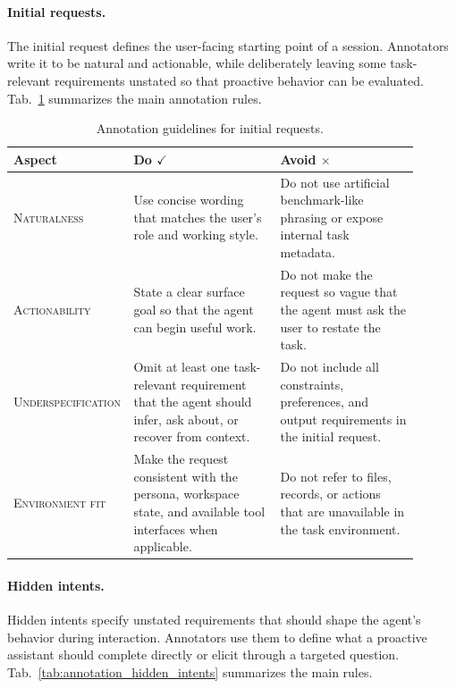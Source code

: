 \documentclass{llmxive}
\begin{document}
\paragraph{Initial requests.}
The initial request defines the user-facing starting point of a session. Annotators write it to be natural and actionable, while deliberately leaving some task-relevant requirements unstated so that proactive behavior can be evaluated. Tab.~\ref{tab:annotation_initial_request} summarizes the main annotation rules.

\begin{table}[tb]
\centering
\small
\begin{tabular}{p{0.20\linewidth}p{0.36\linewidth}p{0.34\linewidth}}
\toprule[1.25pt]
\textbf{Aspect} & \textbf{Do} $\checkmark$ & \textbf{Avoid} $\times$ \\
\midrule[0.75pt]
\textsc{Naturalness} &
Use concise wording that matches the user's role and working style. &
Do not use artificial benchmark-like phrasing or expose internal task metadata. \\
\midrule[0.75pt]
\textsc{Actionability} &
State a clear surface goal so that the agent can begin useful work. &
Do not make the request so vague that the agent must ask the user to restate the task. \\
\midrule[0.75pt]
\textsc{Underspecification} &
Omit at least one task-relevant requirement that the agent should infer, ask about, or recover from context. &
Do not include all constraints, preferences, and output requirements in the initial request. \\
\midrule[0.75pt]
\textsc{Environment fit} &
Make the request consistent with the persona, workspace state, and available tool interfaces when applicable. &
Do not refer to files, records, or actions that are unavailable in the task environment. \\
\bottomrule[1.25pt]
\end{tabular}
\caption{Annotation guidelines for initial requests.}
\label{tab:annotation_initial_request}
\end{table}

\paragraph{Hidden intents.}
Hidden intents specify unstated requirements that should shape the agent's behavior during interaction. Annotators use them to define what a proactive assistant should complete directly or elicit through a targeted question. Tab.~\ref{tab:annotation_hidden_intents} summarizes the main rules.
\end{document}
